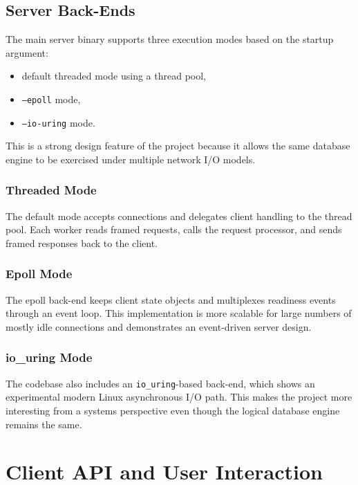 \documentclass[12pt,a4paper]{article}
\begin{document}
\subsection{Server Back-Ends}

The main server binary supports three execution modes based on the startup
argument:

\begin{itemize}[leftmargin=1.8em]
  \item default threaded mode using a thread pool,
  \item \texttt{--epoll} mode,
  \item \texttt{--io-uring} mode.
\end{itemize}

This is a strong design feature of the project because it allows the same
database engine to be exercised under multiple network I/O models.

\subsubsection{Threaded Mode}

The default mode accepts connections and delegates client handling to the
thread pool. Each worker reads framed requests, calls the request processor,
and sends framed responses back to the client.

\subsubsection{Epoll Mode}

The epoll back-end keeps client state objects and multiplexes readiness events
through an event loop. This implementation is more scalable for large numbers
of mostly idle connections and demonstrates an event-driven server design.

\subsubsection{io\_uring Mode}

The codebase also includes an \texttt{io\_uring}-based back-end, which shows an
experimental modern Linux asynchronous I/O path. This makes the project more
interesting from a systems perspective even though the logical database engine
remains the same.

\section{Client API and User Interaction}
\end{document}
